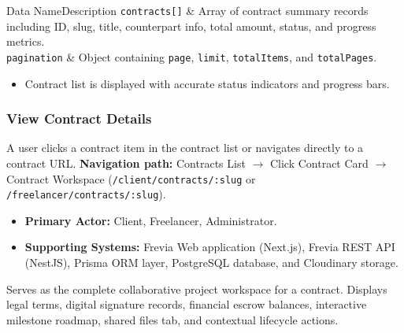 \begin{specdatatable}{Data Name}{Description}
      \texttt{contracts[]} & Array of contract summary records including ID, slug, title, counterpart info, total amount, status, and progress metrics.\\ \hline
      \texttt{pagination} & Object containing \texttt{page}, \texttt{limit}, \texttt{totalItems}, and \texttt{totalPages}.\\ \hline
\end{specdatatable}

\begin{itemize}[leftmargin=1.6em,topsep=3pt,itemsep=2pt,parsep=0pt,label=$\bullet$]
      \item Contract list is displayed with accurate status indicators and progress bars.
\end{itemize}

\subsubsection{ View Contract Details}

A user clicks a contract item in the contract list or navigates directly to a contract URL.\newline
\textbf{Navigation path:} Contracts List $\rightarrow$ Click Contract Card $\rightarrow$ Contract Workspace (\texttt{/client/contracts/:slug} or \texttt{/freelancer/contracts/:slug}).


\begin{itemize}[leftmargin=1.6em,topsep=3pt,itemsep=2pt,parsep=0pt,label=$\bullet$]
      \item \textbf{Primary Actor:} Client, Freelancer, Administrator.
      \item \textbf{Supporting Systems:} Frevia Web application (Next.js), Frevia REST API (NestJS), Prisma ORM layer, PostgreSQL database, and Cloudinary storage.
\end{itemize}

\noindent Serves as the complete collaborative project workspace for a contract. Displays legal terms, digital signature records, financial escrow balances, interactive milestone roadmap, shared files tab, and contextual lifecycle actions.

